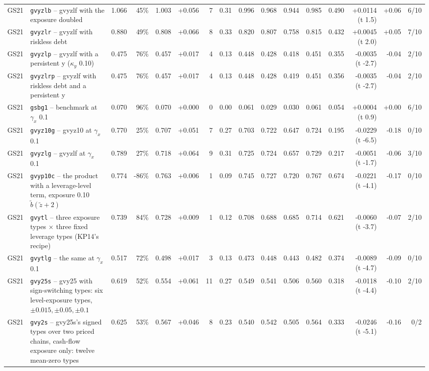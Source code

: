 \begin{landscape}
\begin{longtable}{lp{4.6cm}rrrrrrrrrrrrrr}
GS21 & \texttt{gvyzlb} -- gvyzlf with the exposure doubled & 1.066 & 45\% & 1.003 & +0.056 & 7 & 0.31 & 0.996 & 0.968 & 0.944 & 0.985 & 0.490 & +0.0114 (t 1.5) & +0.06 & 6/10 \\
GS21 & \texttt{gvyzlr} -- gvyzlf with riskless debt & 0.880 & 49\% & 0.808 & +0.066 & 8 & 0.33 & 0.820 & 0.807 & 0.758 & 0.815 & 0.432 & +0.0045 (t 2.0) & +0.05 & 7/10 \\
GS21 & \texttt{gvyzlp} -- gvyzlf with a persistent y ($\kappa_y$ 0.10) & 0.475 & 76\% & 0.457 & +0.017 & 4 & 0.13 & 0.448 & 0.428 & 0.418 & 0.451 & 0.355 & -0.0035 (t -2.7) & -0.04 & 2/10 \\
GS21 & \texttt{gvyzlrp} -- gvyzlf with riskless debt and a persistent y & 0.475 & 76\% & 0.457 & +0.017 & 4 & 0.13 & 0.448 & 0.428 & 0.419 & 0.451 & 0.356 & -0.0035 (t -2.7) & -0.04 & 2/10 \\
GS21 & \texttt{gsbg1} -- benchmark at $\gamma_x$ 0.1 & 0.070 & 96\% & 0.070 & +0.000 & 0 & 0.00 & 0.061 & 0.029 & 0.030 & 0.061 & 0.054 & +0.0004 (t 0.9) & +0.00 & 6/10 \\
GS21 & \texttt{gvyz10g} -- gvyz10 at $\gamma_x$ 0.1 & 0.770 & 25\% & 0.707 & +0.051 & 7 & 0.27 & 0.703 & 0.722 & 0.647 & 0.724 & 0.195 & -0.0229 (t -6.5) & -0.18 & 0/10 \\
GS21 & \texttt{gvyzlg} -- gvyzlf at $\gamma_x$ 0.1 & 0.789 & 27\% & 0.718 & +0.064 & 9 & 0.31 & 0.725 & 0.724 & 0.657 & 0.729 & 0.217 & -0.0051 (t -1.7) & -0.06 & 3/10 \\
GS21 & \texttt{gvyp10c} -- the product with a leverage-level term, exposure 0.10 $\tilde b(\tilde z + 2)$ & 0.774 & -86\% & 0.763 & +0.006 & 1 & 0.09 & 0.745 & 0.727 & 0.720 & 0.767 & 0.674 & -0.0221 (t -4.1) & -0.17 & 0/10 \\
GS21 & \texttt{gvytl} -- three exposure types $\times$ three fixed leverage types (KP14's recipe) & 0.739 & 84\% & 0.728 & +0.009 & 1 & 0.12 & 0.708 & 0.688 & 0.685 & 0.714 & 0.621 & -0.0060 (t -3.7) & -0.07 & 2/10 \\
GS21 & \texttt{gvytlg} -- the same at $\gamma_x$ 0.1 & 0.517 & 72\% & 0.498 & +0.017 & 3 & 0.13 & 0.473 & 0.448 & 0.443 & 0.482 & 0.374 & -0.0089 (t -4.7) & -0.09 & 0/10 \\
GS21 & \texttt{gvy25s} -- gvy25 with sign-switching types: six level-exposure types, $\pm 0.015, \pm 0.05, \pm 0.1$ & 0.619 & 52\% & 0.554 & +0.061 & 11 & 0.27 & 0.549 & 0.541 & 0.506 & 0.560 & 0.318 & -0.0118 (t -4.4) & -0.10 & 2/10 \\
GS21 & \texttt{gvy2s} -- gvy25s's signed types over two priced chains, cash-flow exposure only: twelve mean-zero types & 0.625 & 53\% & 0.567 & +0.046 & 8 & 0.23 & 0.540 & 0.542 & 0.505 & 0.564 & 0.333 & -0.0246 (t -5.1) & -0.16 & 0/2 \\

\end{longtable}
\end{landscape}
